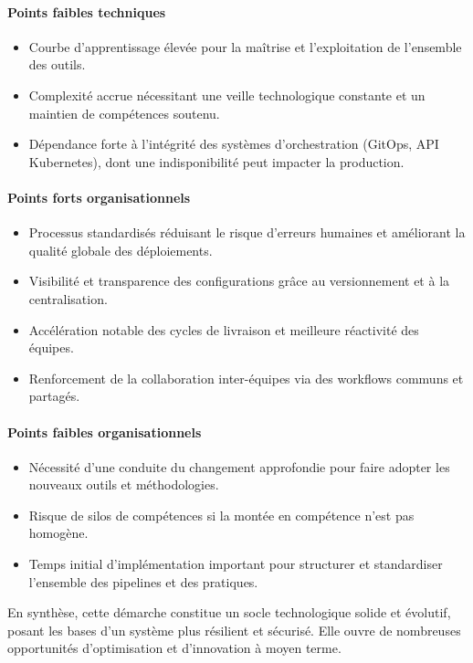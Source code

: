 \paragraph{Points faibles techniques}
\begin{itemize}
	\item Courbe d’apprentissage élevée pour la maîtrise et l’exploitation de l’ensemble des outils.
	\item Complexité accrue nécessitant une veille technologique constante et un maintien de compétences soutenu.
	\item Dépendance forte à l’intégrité des systèmes d’orchestration (GitOps, API Kubernetes), dont une indisponibilité peut impacter la production.
\end{itemize}

\paragraph{Points forts organisationnels}
\begin{itemize}
	\item Processus standardisés réduisant le risque d’erreurs humaines et améliorant la qualité globale des déploiements.
	\item Visibilité et transparence des configurations grâce au versionnement et à la centralisation.
	\item Accélération notable des cycles de livraison et meilleure réactivité des équipes.
	\item Renforcement de la collaboration inter-équipes via des workflows communs et partagés.
\end{itemize}

\paragraph{Points faibles organisationnels}
\begin{itemize}
	\item Nécessité d’une conduite du changement approfondie pour faire adopter les nouveaux outils et méthodologies.
	\item Risque de silos de compétences si la montée en compétence n’est pas homogène.
	\item Temps initial d’implémentation important pour structurer et standardiser l’ensemble des pipelines et des pratiques.
\end{itemize}

En synthèse, cette démarche constitue un socle technologique solide et évolutif, posant les bases d’un système plus résilient et sécurisé. Elle ouvre de nombreuses opportunités d’optimisation et d’innovation à moyen terme.